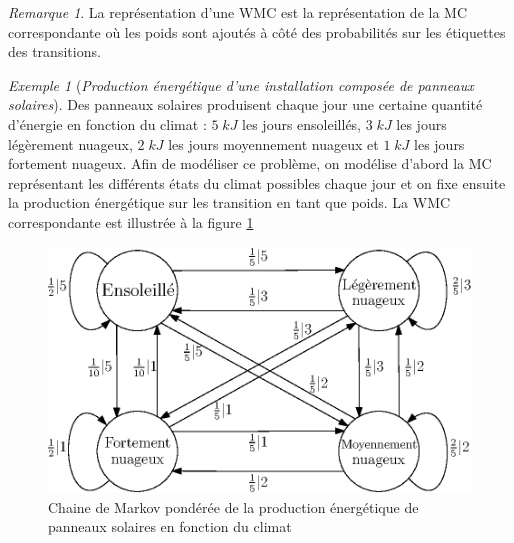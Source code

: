 \documentclass[12pt,a4paper]{report}
\theoremstyle{definition}%
\theoremstyle{remark}
\newtheorem{example}{Exemple}[chapter]
\newtheorem{remark}{Remarque}[chapter]
\begin{document}
\begin{remark}
	La représentation d'une WMC est la représentation de la MC correspondante où les poids sont ajoutés à côté des probabilités sur les étiquettes des transitions.
\end{remark}
\begin{example}[\textit{Production énergétique d'une installation composée de panneaux solaires}]\label{solar-pannel-example}
	Des panneaux solaires produisent chaque jour une certaine quantité d'énergie en fonction du climat : $5\; kJ$ les jours ensoleillés, $3\; kJ$ les jours légèrement nuageux, $2\; kJ$ les jours moyennement nuageux et $1\; kJ$ les jours fortement nuageux. Afin de modéliser ce problème, on modélise d'abord la MC représentant les différents états du climat possibles chaque jour et on fixe ensuite la production énergétique sur les transition en tant que poids. La WMC correspondante est illustrée à la figure \ref{solar-pannel-1}
	
	\begin{figure}[H]
		\centering
		\includegraphics[scale=0.9]{figures/weather-solar-pannel.eps}
		\caption{Chaine de Markov pondérée de la production énergétique de panneaux solaires en fonction du climat}
		\label{solar-pannel-1}
	\end{figure}
\end{example}
\end{document}
